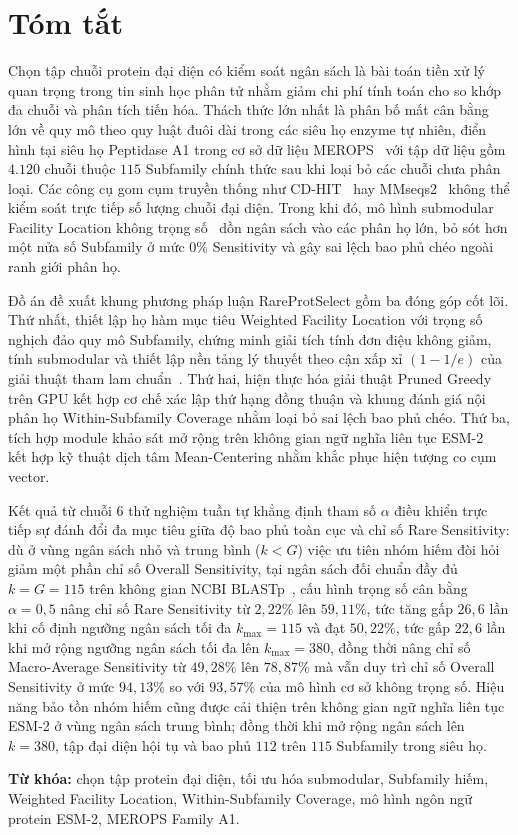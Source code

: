 \chapter*{Tóm tắt}
{}

Chọn tập chuỗi protein đại diện có kiểm soát ngân sách là bài toán tiền xử lý quan trọng trong tin sinh học phân tử nhằm giảm chi phí tính toán cho so khớp đa chuỗi và phân tích tiến hóa. Thách thức lớn nhất là phân bố mất cân bằng lớn về quy mô theo quy luật đuôi dài trong các siêu họ enzyme tự nhiên, điển hình tại siêu họ Peptidase A1 trong cơ sở dữ liệu MEROPS~\cite{merops} với tập dữ liệu gồm $4.120$ chuỗi thuộc $115$ Subfamily chính thức sau khi loại bỏ các chuỗi chưa phân loại. Các công cụ gom cụm truyền thống như CD-HIT~\cite{cdhit} hay MMseqs2~\cite{mmseqs2} không thể kiểm soát trực tiếp số lượng chuỗi đại diện. Trong khi đó, mô hình submodular Facility Location không trọng số~\cite{nguyen2025} dồn ngân sách vào các phân họ lớn, bỏ sót hơn một nửa số Subfamily ở mức $0\%$ Sensitivity và gây sai lệch bao phủ chéo ngoài ranh giới phân họ.

Đồ án đề xuất khung phương pháp luận RareProtSelect gồm ba đóng góp cốt lõi. Thứ nhất, thiết lập họ hàm mục tiêu Weighted Facility Location với trọng số nghịch đảo quy mô Subfamily, chứng minh giải tích tính đơn điệu không giảm, tính submodular và thiết lập nền tảng lý thuyết theo cận xấp xỉ $(1 - 1/e)$ của giải thuật tham lam chuẩn~\cite{nemhauser1978}. Thứ hai, hiện thực hóa giải thuật Pruned Greedy trên GPU kết hợp cơ chế xác lập thứ hạng đồng thuận và khung đánh giá nội phân họ Within-Subfamily Coverage nhằm loại bỏ sai lệch bao phủ chéo. Thứ ba, tích hợp module khảo sát mở rộng trên không gian ngữ nghĩa liên tục ESM-2~\cite{esm2} kết hợp kỹ thuật dịch tâm Mean-Centering nhằm khắc phục hiện tượng co cụm vector.

Kết quả từ chuỗi 6 thử nghiệm tuần tự khẳng định tham số $\alpha$ điều khiển trực tiếp sự đánh đổi đa mục tiêu giữa độ bao phủ toàn cục và chỉ số Rare Sensitivity: dù ở vùng ngân sách nhỏ và trung bình ($k < G$) việc ưu tiên nhóm hiếm đòi hỏi giảm một phần chỉ số Overall Sensitivity, tại ngân sách đối chuẩn đầy đủ $k = G = 115$ trên không gian NCBI BLASTp~\cite{blast}, cấu hình trọng số cân bằng $\alpha = 0{,}5$ nâng chỉ số Rare Sensitivity từ $2{,}22\%$ lên $59{,}11\%$, tức tăng gấp $26{,}6$ lần khi cố định ngưỡng ngân sách tối đa $k_{\max} = 115$ và đạt $50{,}22\%$, tức gấp $22{,}6$ lần khi mở rộng ngưỡng ngân sách tối đa lên $k_{\max} = 380$, đồng thời nâng chỉ số Macro-Average Sensitivity từ $49{,}28\%$ lên $78{,}87\%$ mà vẫn duy trì chỉ số Overall Sensitivity ở mức $94{,}13\%$ so với $93{,}57\%$ của mô hình cơ sở không trọng số. Hiệu năng bảo tồn nhóm hiếm cũng được cải thiện trên không gian ngữ nghĩa liên tục ESM-2 ở vùng ngân sách trung bình; đồng thời khi mở rộng ngân sách lên $k = 380$, tập đại diện hội tụ và bao phủ $112$ trên $115$ Subfamily trong siêu họ.

\smallskip

{\raggedright\noindent\textbf{Từ khóa:} chọn tập protein đại diện, tối ưu hóa submodular, Subfamily hiếm, Weighted Facility Location, Within-Subfamily Coverage, mô hình ngôn ngữ protein ESM-2, MEROPS Family A1.\par}

\clearpage
